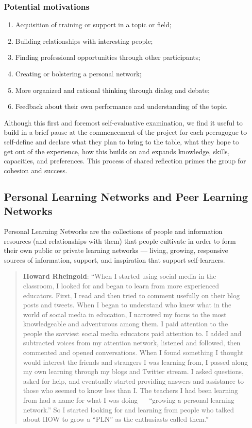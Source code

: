 \subsubsection{Potential motivations}

\begin{enumerate}
\item
  Acquisition of training or support in a topic or field;
\item
  Building relationships with interesting people;
\item
  Finding professional opportunities through other participants;
\item
  Creating or bolstering a personal network;
\item
  More organized and rational thinking through dialog and debate;
\item
  Feedback about their own performance and understanding of the topic.
\end{enumerate}
Although this first and foremost self-evaluative examination, we find it
useful to build in a brief pause at the commencement of the project for
each peeragogue to self-define and declare what they plan to bring to
the table, what they hope to get out of the experience, how this builds
on and expands knowledge, skills, capacities, and preferences. This
process of shared reflection primes the group for cohesion and success.

\subsection{Personal Learning Networks and Peer Learning Networks}

Personal Learning Networks are the collections of people and information
resources (and relationships with them) that people cultivate in order
to form their own public or private learning networks --- living,
growing, responsive sources of information, support, and inspiration
that support self-learners.

\begin{quote}
\textbf{Howard Rheingold}: ``When I started using social media in the
classroom, I looked for and began to learn from more experienced
educators. First, I read and then tried to comment usefully on their
blog posts and tweets. When I began to understand who knew what in the
world of social media in education, I narrowed my focus to the most
knowledgeable and adventurous among them. I paid attention to the people
the savviest social media educators paid attention to. I added and
subtracted voices from my attention network, listened and followed, then
commented and opened conversations. When I found something I thought
would interest the friends and strangers I was learning from, I passed
along my own learning through my blogs and Twitter stream. I asked
questions, asked for help, and eventually started providing answers and
assistance to those who seemed to know less than I. The teachers I had
been learning from had a name for what I was doing --- ``growing a
personal learning network.'' So I started looking for and learning from
people who talked about HOW to grow a ``PLN'' as the enthusiasts called
them.''
\end{quote}


